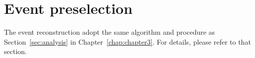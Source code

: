\section{Event preselection}
\label{sec:analysisEXO-14-009}


The event reconstruction adopt the same algorithm and procedure as
Section~\ref{sec:analysis} in Chapter~\ref{chap:chapter3}. For details, please refer to that section.  




